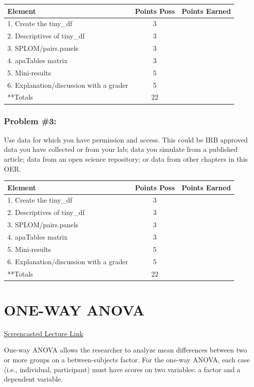 \documentclass[
  english,
]{book}
\begin{document}
\begin{longtable}[]{@{}lcl@{}}
\toprule
Element & Points Poss & Points Earned \\
\midrule
\endhead
1. Create the tiny\_df & 3 & \\
2. Descriptives of tiny\_df & 3 & \\
3. SPLOM/pairs.panels & 3 & \\
4. apaTables matrix & 3 & \\
5. Mini-results & 5 & \\
6. Explanation/discussion with a grader & 5 & \\
**Totals & 22 & \\
\bottomrule
\end{longtable}

\hypertarget{problem-3}{%
\subsection{Problem \#3:}\label{problem-3}}

Use data for which you have permission and access. This could be IRB approved data you have collected or from your lab; data you simulate from a published article; data from an open science repository; or data from other chapters in this OER.

\begin{longtable}[]{@{}lcl@{}}
\toprule
Element & Points Poss & Points Earned \\
\midrule
\endhead
1. Create the tiny\_df & 3 & \\
2. Descriptives of tiny\_df & 3 & \\
3. SPLOM/pairs.panels & 3 & \\
4. apaTables matrix & 3 & \\
5. Mini-results & 5 & \\
6. Explanation/discussion with a grader & 5 & \\
**Totals & 22 & \\
\bottomrule
\end{longtable}

\hypertarget{oneway}{%
\chapter{ONE-WAY ANOVA}\label{oneway}}

\href{https://spu.hosted.panopto.com/Panopto/Pages/Viewer.aspx?pid=150b68bf-c880-4348-8114-acb7000b227e}{Screencasted Lecture Link}

One-way ANOVA allows the researcher to analyze mean differences between two or more groups on a between-subjects factor. For the one-way ANOVA, each case (i.e., individual, participant) must have scores on two variables: a factor and a dependent variable.
\end{document}
